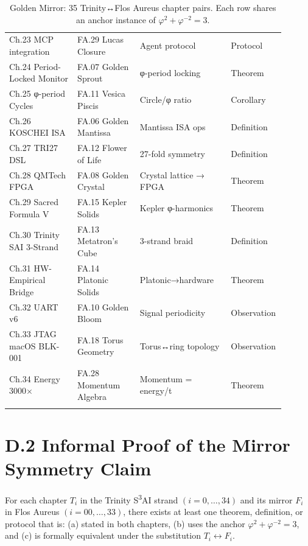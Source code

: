 {\begin{longtable}{@{}p{0.24\linewidth}p{0.22\linewidth}p{0.32\linewidth}p{0.12\linewidth}@{}}
Ch.23 MCP integration & FA.29 Lucas Closure & Agent protocol & Protocol \\
Ch.24 Period-Locked Monitor & FA.07 Golden Sprout & φ-period locking & Theorem \\
Ch.25 φ-period Cycles & FA.11 Vesica Piscis & Circle/φ ratio & Corollary \\
Ch.26 KOSCHEI ISA & FA.06 Golden Mantissa & Mantissa ISA ops & Definition \\
Ch.27 TRI27 DSL & FA.12 Flower of Life & 27-fold symmetry & Definition \\
Ch.28 QMTech FPGA & FA.08 Golden Crystal & Crystal lattice → FPGA & Theorem \\
Ch.29 Sacred Formula V & FA.15 Kepler Solids & Kepler φ-harmonics & Theorem \\
Ch.30 Trinity SAI 3-Strand & FA.13 Metatron's Cube & 3-strand braid & Definition \\
Ch.31 HW-Empirical Bridge & FA.14 Platonic Solids & Platonic→hardware & Theorem \\
Ch.32 UART v6 & FA.10 Golden Bloom & Signal periodicity & Observation \\
Ch.33 JTAG macOS BLK-001 & FA.18 Torus Geometry & Torus↔ring topology & Observation \\
Ch.34 Energy 3000× & FA.28 Momentum Algebra & Momentum = energy/t & Theorem \\
\bottomrule
\caption{Golden Mirror: 35 Trinity↔Flos Aureus chapter pairs.
         Each row shares an anchor instance of $\varphi^2+\varphi^{-2}=3$.}
\label{tab:D1}
\end{longtable}
}

\section*{D.2  Informal Proof of the Mirror Symmetry Claim}

\begin{theorem}
\label{thm:D:1}
For each chapter $T_i$ in the Trinity S\textsuperscript{3}AI strand
$(i = 0,\ldots,34)$ and its mirror $F_i$ in Flos Aureus $(i = 00,\ldots,33)$,
there exists at least one theorem, definition, or protocol that is:
(a) stated in both chapters, (b) uses the anchor $\varphi^2+\varphi^{-2}=3$,
and (c) is formally equivalent under the substitution $T_i \leftrightarrow F_i$.
\end{theorem}

